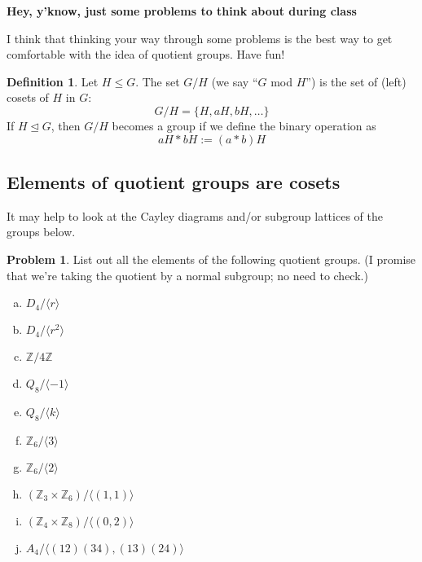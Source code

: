 \documentclass[12pt]{article}
\theoremstyle{definition} %
\newtheorem{problem}{Problem}
\newtheorem*{definition}{Definition}
\newcommand{\Z}{\mathbb{Z}}
\def\<{\langle}
\def\>{\rangle}
\def\normaleq{\unlhd}
\renewcommand{\section}[1]{\begin{center} \textbf{#1} \\\end{center}}
\begin{document}
\section{Hey, y'know, just some problems to think about during class} %

I think that thinking your way through some problems is the best way to get comfortable with the idea of quotient groups. Have fun!

\begin{definition}
    Let $H \leq G$. The set $G/H$ (we say ``$G$ mod $H$'') is the set of (left) cosets of $H$ in $G$: 
    \[G/H = \{H, aH, bH, \ldots\}\]
    If $H\normaleq G$, then $G/H$ becomes a group if we define the binary operation as
    \[aH \ast bH := (a\ast b)H\]
\end{definition}

\subsection*{Elements of quotient groups are cosets}

It may help to look at the Cayley diagrams and/or subgroup lattices of the groups below.

\begin{problem}\label{elements}
    List out all the elements of the following quotient groups. (I promise that we're taking the quotient by a normal subgroup; no need to check.)
    \begin{multicols}{2}
        \begin{enumerate}[(a)]
            \item $D_4 / \< r \>$
            \item $D_4 / \< r^2 \>$
            \item $\Z / 4\Z$
            \item $Q_8 / \< -1 \>$
            \item $Q_8 / \< k \>$
            \item $\Z_6 / \< 3 \>$
            \item $\Z_6 / \< 2 \>$
            \item $(\Z_3 \times \Z_6) / \< (1, 1) \>$
            \item $(\Z_4 \times \Z_8) / \< (0 ,2) \>$
            \item $A_4 / \<(12)(34), (13)(24)\>$
        \end{enumerate}
    \end{multicols}
\end{problem}
\end{document}
